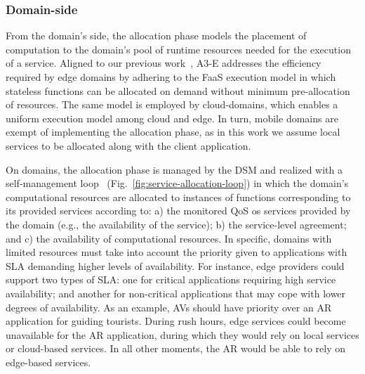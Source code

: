 \subsubsection*{Domain-side} From the domain's side, the allocation phase models the placement of computation to the domain's pool of runtime resources needed for the execution of a service. 
Aligned to our previous work~\cite{GarrigaMendonca2017}, A3-E addresses the efficiency required by edge domains by adhering to the FaaS execution model in which stateless functions can be allocated on demand without minimum pre-allocation of resources. The same model is employed by cloud-domains, which enables a uniform execution model among cloud and edge. In turn, mobile domains are exempt of implementing the allocation phase, as in this work we assume local services to be allocated along with the client application. 

On domains, the allocation phase is managed by the DSM and realized with a self-management loop~\cite{kephart2003vision} (Fig.~\ref{fig:service-allocation-loop}) in which the domain's computational resources are allocated to instances of functions corresponding to its provided services according to: a) the monitored QoS os services provided by the domain (e.g., the availability of the service); b) the service-level agreement; and c) the availability of computational resources. In specific, domains with limited resources must take into account the priority given to applications with SLA demanding higher levels of availability. 
For instance, edge providers could support two types of SLA: one for critical applications requiring high service availability; and another for non-critical applications that may cope with lower degrees of availability. 
As an example, AVs should have priority over an AR application for guiding tourists. During rush hours, edge services could become unavailable for the AR application, during which they would rely on local services or cloud-based services. In all other moments, the AR would be able to rely on edge-based services. 

